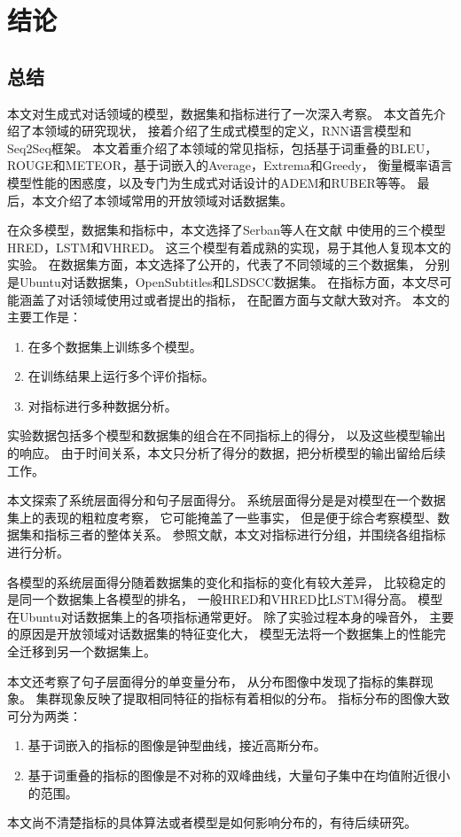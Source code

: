 \chapter*{结论}\label{ch:conclusion}

\section*{总结}\label{sec:conclusion}

本文对生成式对话领域的模型，数据集和指标进行了一次深入考察。
本文首先介绍了本领域的研究现状，
接着介绍了生成式模型的定义，RNN语言模型和Seq2Seq框架。
本文着重介绍了本领域的常见指标，包括基于词重叠的BLEU，
ROUGE和METEOR，基于词嵌入的Average，Extrema和Greedy，
衡量概率语言模型性能的困惑度，以及专门为生成式对话设计的ADEM和RUBER等等。
最后，本文介绍了本领域常用的开放领域对话数据集。

在众多模型，数据集和指标中，本文选择了Serban等人在文献\cite{VHRED}
中使用的三个模型HRED，LSTM和VHRED。
这三个模型有着成熟的实现，易于其他人复现本文的实验。
在数据集方面，本文选择了公开的，代表了不同领域的三个数据集，
分别是Ubuntu对话数据集，OpenSubtitles和LSDSCC数据集。
在指标方面，本文尽可能涵盖了对话领域使用过或者提出的指标，
在配置方面与文献\cite{HowNot}大致对齐。
本文的主要工作是：
\begin{enumerate}
    \item 在多个数据集上训练多个模型。
    \item 在训练结果上运行多个评价指标。
    \item 对指标进行多种数据分析。
\end{enumerate}
实验数据包括多个模型和数据集的组合在不同指标上的得分， 以及这些模型输出的响应。
由于时间关系，本文只分析了得分的数据，把分析模型的输出留给后续工作。

本文探索了系统层面得分和句子层面得分。
系统层面得分是是对模型在一个数据集上的表现的粗粒度考察，
它可能掩盖了一些事实，
但是便于综合考察模型、数据集和指标三者的整体关系。
参照文献\cite{HowNot}，本文对指标进行分组，并围绕各组指标进行分析。

各模型的系统层面得分随着数据集的变化和指标的变化有较大差异，
比较稳定的是同一个数据集上各模型的排名，
一般HRED和VHRED比LSTM得分高。
模型在Ubuntu对话数据集上的各项指标通常更好。
除了实验过程本身的噪音外，
主要的原因是开放领域对话数据集的特征变化大，
模型无法将一个数据集上的性能完全迁移到另一个数据集上。

本文还考察了句子层面得分的单变量分布，
从分布图像中发现了指标的集群现象。
集群现象反映了提取相同特征的指标有着相似的分布。
指标分布的图像大致可分为两类：
\begin{enumerate}
    \item 基于词嵌入的指标的图像是钟型曲线，接近高斯分布。
    \item 基于词重叠的指标的图像是不对称的双峰曲线，大量句子集中在均值附近很小的范围。
\end{enumerate}
本文尚不清楚指标的具体算法或者模型是如何影响分布的，有待后续研究。


